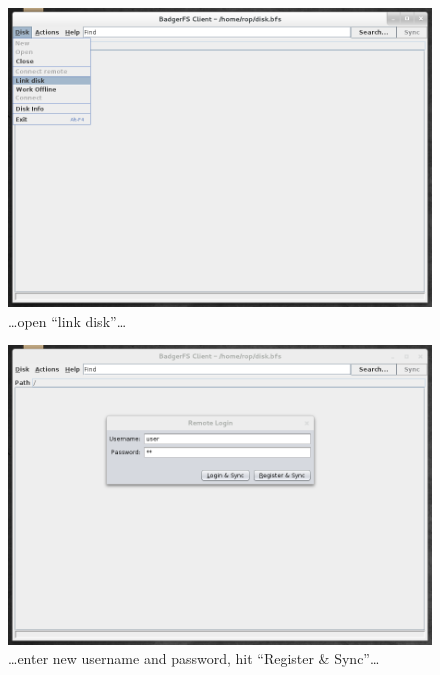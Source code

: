 \begin{figure}[h!]
\centering
\includegraphics[width=1\textwidth]{figures/serverUseCase/03_linkDisk.png}
\caption{\ldots open ``link disk''\ldots}
\label{fig:03_linkDisk.png}
\end{figure}


\begin{figure}[h!]
\centering
\includegraphics[width=1\textwidth]{figures/serverUseCase/04_loginremote.png}
\caption{\ldots enter new username and password, hit ``Register \& Sync''\ldots}
\label{fig:04_loginremote.png}
\end{figure}

